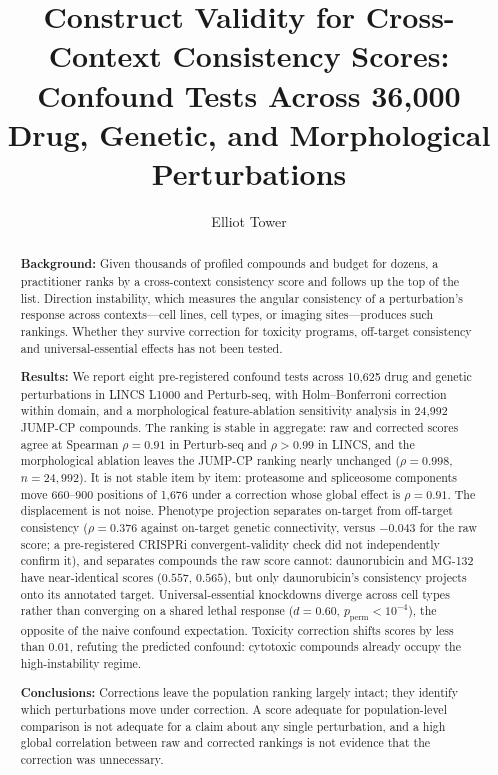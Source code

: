\documentclass[11pt]{article}
\title{Construct Validity for Cross-Context Consistency Scores:\\ Confound Tests Across 36,000 Drug, Genetic, and Morphological Perturbations}
\author{Elliot Tower}
\affil{\texttt{elliot@elliottower.ai}}
\date{}
\begin{document}
\maketitle

\begin{abstract}
\textbf{Background:}
Given thousands of profiled compounds and budget for dozens, a practitioner
ranks by a cross-context consistency score and follows up the top of the
list. Direction instability, which measures the angular consistency of a
perturbation's response across contexts---cell lines, cell types, or
imaging sites---produces such rankings.
Whether they survive correction for toxicity programs, off-target
consistency and universal-essential effects has not been tested.

\textbf{Results:}
We report eight pre-registered confound tests across 10{,}625 drug and
genetic perturbations in LINCS L1000 and Perturb-seq, with
Holm--Bonferroni correction within domain, and a morphological
feature-ablation sensitivity analysis in 24{,}992 JUMP-CP compounds.
The ranking is stable in aggregate: raw and corrected scores agree at
Spearman $\rho = 0.91$ in Perturb-seq and $\rho > 0.99$ in LINCS, and the
morphological ablation leaves the JUMP-CP ranking nearly unchanged
($\rho = 0.998$, $n = 24{,}992$). It is
not stable item by item: proteasome and spliceosome components move
660--900 positions of 1{,}676 under a correction whose global effect is
$\rho = 0.91$. The displacement is not noise. Phenotype projection
separates on-target from off-target consistency ($\rho = 0.376$ against
on-target genetic connectivity, versus $-0.043$ for the raw score; a
pre-registered CRISPRi convergent-validity check did not independently
confirm it), and separates compounds the raw score cannot: daunorubicin and MG-132 have
near-identical scores ($0.557$, $0.565$), but only daunorubicin's
consistency projects onto its annotated target. Universal-essential knockdowns
diverge across cell types rather than converging on a shared lethal response
($d = 0.60$, $p_{\text{perm}} < 10^{-4}$), the opposite of the naive confound
expectation. Toxicity correction shifts scores by less
than $0.01$, refuting the predicted confound: cytotoxic compounds already
occupy the high-instability regime.

\textbf{Conclusions:}
Corrections leave the population ranking largely intact; they identify
which perturbations move under correction. A score adequate
for population-level comparison is not adequate for a claim about any
single perturbation, and a high global correlation between raw
and corrected rankings is not evidence that the correction was
unnecessary.
\end{abstract}
\end{document}
